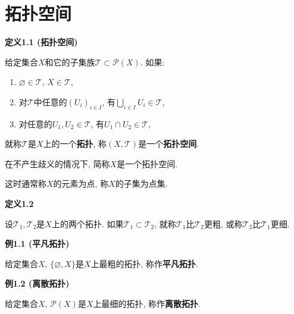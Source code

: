 \documentclass[UTF8]{ctexart}
\begin{document}
\setlength{\abovedisplayskip}{1pt}
\setlength{\belowdisplayskip}{1pt}

\section{拓扑空间}


\hypertarget{sec:定义1.1}{}
\noindent\textbf{定义1.1 (拓扑空间)}

给定集合$X$和它的子集族$\mathcal{T}\subset\mathcal{P}(X)$. 如果:
\begin{enumerate}
    \item $\varnothing\in\mathcal{T},\,X\in\mathcal{T}$,
    \item 对$\mathcal{T}$中任意的$(U_i)_{i\in I}$,
    有$\displaystyle\bigcup_{i\in I}U_i\in\mathcal{T}$,
    \vspace{3pt}
    \item 对任意的$U_1,U_2\in\mathcal{T}$, 有$U_1\cap U_2\in\mathcal{T}$,
\end{enumerate}
就称$\mathcal{T}$是$X$上的一个\textbf{拓扑},
称$(X,\mathcal{T})$是一个\textbf{拓扑空间}.

在不产生歧义的情况下, 简称$X$是一个拓扑空间.

\vspace{10pt}

这时通常称$X$的元素为点, 称$X$的子集为点集.

\vspace{10pt}

\hypertarget{sec:定义1.2}{}
\noindent\textbf{定义1.2}

设$\mathcal{T}_1,\mathcal{T}_2$是$X$上的两个拓扑.
如果$\mathcal{T}_1\subset\mathcal{T}_2$, 就称$\mathcal{T}_1$比$\mathcal{T}_2$更粗,
或称$\mathcal{T}_2$比$\mathcal{T}_1$更细.

\vspace{10pt}

\hypertarget{sec:例1.1}{}
\noindent\textbf{例1.1 (平凡拓扑)}

给定集合$X$, $\{\varnothing,X\}$是$X$上最粗的拓扑, 称作\textbf{平凡拓扑}.

\vspace{10pt}

\hypertarget{sec:例1.2}{}
\noindent\textbf{例1.2 (离散拓扑)}

给定集合$X$, $\mathcal{P}(X)$是$X$上最细的拓扑, 称作\textbf{离散拓扑}.

\vspace{10pt}
\end{document}
